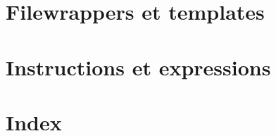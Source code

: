 \documentclass[a4paper, 10pt, obeyspaces, openany]{book}
\begin{document}
\part{Filewrappers et templates}








\part{Instructions et expressions}





%



\part{Index}

{\small
\printindex
}

\end{document}
